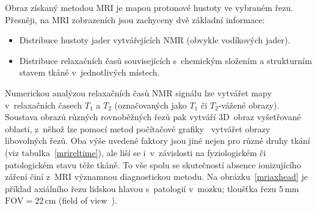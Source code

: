 Obraz získaný metodou MRI je mapou protonové hustoty ve vybraném řezu.
Přesněji, na MRI zobrazeních jsou zachyceny dvě základní informace:
\begin{itemize}
\item Distribuce hustoty jader vytvářejících NMR (obvykle vodíkových jader).
\item Distribuce relaxačních časů souvisejících s~chemickým složením
  a strukturním stavem tkáně v~jednotlivých místech.
\end{itemize}
Numerickou analýzou relaxačních časů NMR signálu lze vytvářet mapy
v~relaxačních časech $T_{1}$ a $T_{2}$ (označovaných jako $T_{1}$ či
$T_{2}$-vážené obrazy).  Soustava obrazů různých rovnoběžných řezů pak vytváří
3D~obraz vyšetřované oblasti, z~něhož lze pomocí metod počítačové
grafiky~\cite{Zar-etal:2004:ModPocGraf:} vytvářet obrazy libovolných řezů.
Oba výše uvedené faktory jsou jiné nejen pro různé druhy tkání (viz
tabulka~\ref{mrireltime}), ale liší se i~v~závislosti na fyziologickém či
patologickém stavu téže tkáně. To vše spolu se skutečností absence
ionizujícího záření činí z~MRI významnou
diagnostickou metodu. Na obrázku~\ref{mriaxhead} je příklad axiálního řezu
lidskou hlavou s~patologií v~mozku; tloušťka řezu $5\,\mathrm{mm}$
$\mathrm{FOV}=22\,\mathrm{cm}$ (field of view~\cite{Hor:LIVE:BasicsMRI:}).

\endinput

